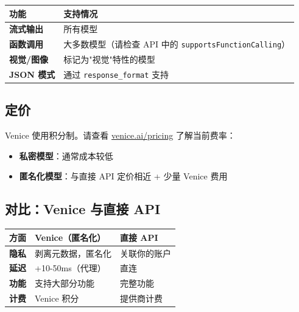 \begin{table}[h]
\centering
\small
\begin{tabular}{|l|l|}
\hline
功能 & 支持情况 \\
\hline
\textbf{流式输出} & \emoji{✅} 所有模型 \\
\hline
\textbf{函数调用} & \emoji{✅} 大多数模型（请检查 API 中的 \texttt{supportsFunctionCalling}） \\
\hline
\textbf{视觉/图像} & \emoji{✅} 标记为"视觉"特性的模型 \\
\hline
\textbf{JSON 模式} & \emoji{✅} 通过 \texttt{response\_format} 支持 \\
\hline
\end{tabular}
\end{table}



\subsection{定价}


Venice 使用积分制。请查看 \href{https://venice.ai/pricing}{venice.ai/pricing} 了解当前费率：

\begin{itemize}
  \item \textbf{私密模型}：通常成本较低
  \item \textbf{匿名化模型}：与直接 API 定价相近 + 少量 Venice 费用
\end{itemize}


\subsection{对比：Venice 与直接 API}



\begin{table}[h]
\centering
\small
\begin{tabular}{|l|l|l|}
\hline
方面 & Venice（匿名化） & 直接 API \\
\hline
\textbf{隐私} & 剥离元数据，匿名化 & 关联你的账户 \\
\hline
\textbf{延迟} & +10-50ms（代理） & 直连 \\
\hline
\textbf{功能} & 支持大部分功能 & 完整功能 \\
\hline
\textbf{计费} & Venice 积分 & 提供商计费 \\
\hline
\end{tabular}
\end{table}



